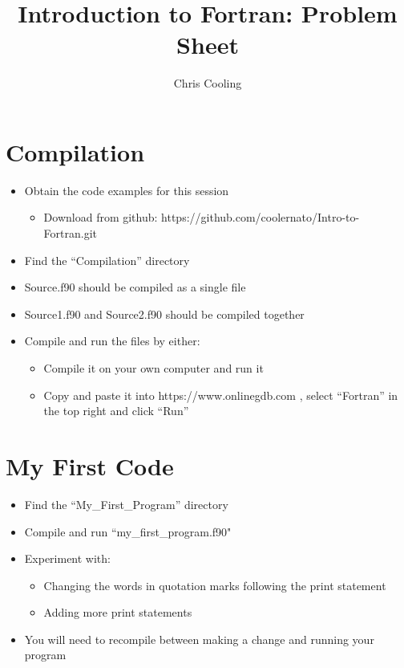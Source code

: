\documentclass[11pt,a4paper]{article}
\begin{document}
\title{Introduction to Fortran: Problem Sheet}
\author{Chris Cooling}
\maketitle
\pagestyle{empty}
\thispagestyle{empty}

\section{Compilation}
\begin{itemize}
\item Obtain the code examples for this session
\begin{itemize}
\item Download from github: https://github.com/coolernato/Intro-to-Fortran.git
\end{itemize}
\item Find the “Compilation” directory
\item Source.f90 should be compiled as a single file
\item Source1.f90 and Source2.f90 should be compiled together
\item Compile and run the files by either:
\begin{itemize}
\item Compile it on your own computer and run it
\item Copy and paste it into https://www.onlinegdb.com , select “Fortran” in the top right and click “Run”
\end{itemize}
\end{itemize}

\section{My First Code}
\begin{itemize}
    \item Find the ``My\_First\_Program” directory
    \item Compile and run ``my\_first\_program.f90"
    \item Experiment with:
\begin{itemize}
    \item Changing the words in quotation marks following the print statement
    \item Adding more print statements
\end{itemize}
    \item You will need to recompile between making a change and running your program
\end{itemize}
\end{document}
